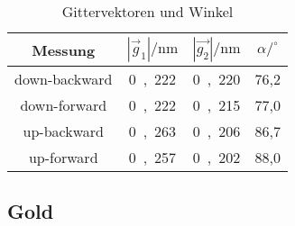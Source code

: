 \documentclass[paper=a4]{scrartcl}
\begin{document}
\begin{table}[H]
	\begin{center}
		\begin{tabular}{c c c c}
			\toprule
			Messung & $|\vec{g}_1| / \mathrm{nm}$ & $|\vec{g_2}| / \mathrm{nm}$ & $\alpha /^\circ $ \\
			\midrule
			down-backward & \si{0,222} & \si{0,220} & 76,2 \\
			down-forward & \si{0,222} & \si{0,215} & 77,0 \\
			up-backward & \si{0,263} & \si{0,206} & 86,7 \\
			up-forward & \si{0,257} & \si{0,202} & 88,0 \\
			\bottomrule
		\end{tabular}
		\caption{Gittervektoren und Winkel}
		\label{fig:t1}
	\end{center}
\end{table}

\subsection{Gold}
\end{document}
